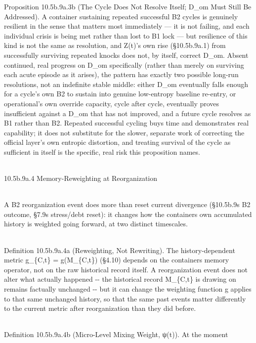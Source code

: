 \documentclass[
]{article}
\begin{document}
Proposition 10.5b.9a.3b (The Cycle Does Not Resolve Itself; D\_om Must
Still Be Addressed). A container sustaining repeated successful B2
cycles is genuinely resilient in the sense that matters most immediately
--- it is not failing, and each individual crisis is being met rather
than lost to B1 lock --- but resilience of this kind is not the same as
resolution, and Z(t)'s own rise (§10.5b.9a.1) from successfully surviving
repeated knocks does not, by itself, correct D\_om. Absent continued,
real progress on D\_om specifically (rather than merely on surviving
each acute episode as it arises), the pattern has exactly two possible
long-run resolutions, not an indefinite stable middle: either D\_om
eventually falls enough for a cycle's own B2 to sustain into genuine
low-entropy baseline re-entry, or operational's own override capacity,
cycle after cycle, eventually proves insufficient against a D\_om that
has not improved, and a future cycle resolves as B1 rather than B2.
Repeated successful cycling buys time and demonstrates real capability;
it does not substitute for the slower, separate work of correcting the
official layer's own entropic distortion, and treating survival of the
cycle as sufficient in itself is the specific, real risk this
proposition names.\\
\strut \\
10.5b.9a.4 Memory-Reweighting at Reorganization\\
\strut \\
A B2 reorganization event does more than reset current divergence
(§10.5b.9\textquotesingle s B2 outcome, §7.9\textquotesingle s
stress/debt reset): it changes how the container\textquotesingle s own
accumulated history is weighted going forward, at two distinct
timescales.\\
\strut \\
Definition 10.5b.9a.4a (Reweighting, Not Rewriting). The
history-dependent metric g\_\{C,t\} = g(M\_\{C,t\}) (§4.10) depends on
the container\textquotesingle s memory operator, not on the raw
historical record itself. A reorganization event does not alter what
actually happened -\/- the historical record M\_\{C,t\} is drawing on
remains factually unchanged -\/- but it can change the weighting
function g applies to that same unchanged history, so that the same past
events matter differently to the current metric after reorganization
than they did before.\\
\strut \\
Definition 10.5b.9a.4b (Micro-Level Mixing Weight, ψ(t)). At the moment
\end{document}
